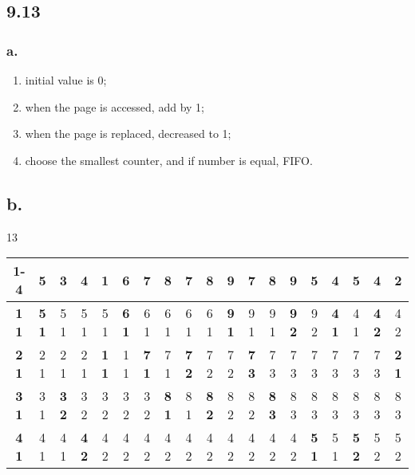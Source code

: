\documentclass[11pt]{article}
\begin{document}
\subsection*{9.13}

\subsubsection*{a.}

\begin{enumerate}
    \item initial value is 0;
    \item when the page is accessed, add by 1;
    \item when the page is replaced, decreased to 1;
    \item choose the smallest counter, and if number is equal, FIFO.
\end{enumerate}

\subsection*{b.}
13
\begin{table}[H]
    \begin{tabular}{|c|c|c|c|c|c|c|c|c|c|c|c|c|c|c|c|c|c|c|}
    \hline
    1-4          & \textbf{5}   & \textbf{3}   & 4            & \textbf{1}   & \textbf{6}   & \textbf{7}   & \textbf{8}   & \textbf{7}   & \textbf{8}   & \textbf{9}   & \textbf{7}   & \textbf{8}   & \textbf{9}   & \textbf{5}   & \textbf{4}   & \textbf{5}   & \textbf{4}   & \textbf{2}   \\ \hline
    \textbf{1 1} & \textbf{5 1} & 5 1          & 5 1          & 5 1          & \textbf{6 1} & 6 1          & 6 1          & 6 1          & 6 1          & \textbf{9 1} & 9 1          & 9 1          & \textbf{9 2} & 9 2          & \textbf{4 1} & 4 1          & \textbf{4 2} & 4 2          \\ \hline
    \textbf{2 1} & 2 1          & 2 1          & 2 1          & \textbf{1 1} & 1 1          & \textbf{7 1} & 7 1          & \textbf{7 2} & 7 2          & 7 2          & \textbf{7 3} & 7 3          & 7 3          & 7 3          & 7 3          & 7 3          & 7 3          & \textbf{2 1} \\ \hline
    \textbf{3 1} & 3 1          & \textbf{3 2} & 3 2          & 3 2          & 3 2          & 3 2          & \textbf{8 1} & 8 1          & \textbf{8 2} & 8 2          & 8 2          & \textbf{8 3} & 8 3          & 8 3          & 8 3          & 8 3          & 8 3          & 8 3          \\ \hline
    \textbf{4 1} & 4 1          & 4 1          & \textbf{4 2} & 4 2          & 4 2          & 4 2          & 4 2          & 4 2          & 4 2          & 4 2          & 4 2          & 4 2          & 4 2          & \textbf{5 1} & 5 1          & \textbf{5 2} & 5 2          & 5 2          \\ \hline
    \end{tabular}
\end{table}
\end{document}
